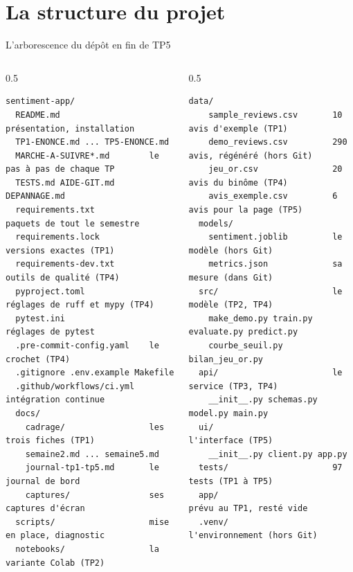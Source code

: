 \documentclass[aspectratio=169,11pt]{beamer}
\begin{document}
\section{La structure du projet}

\begin{frame}[fragile]{L'arborescence du dépôt en fin de TP5}
\begin{columns}[T]
\begin{column}{0.5\textwidth}
\begin{lstlisting}[basicstyle=\ttfamily\tiny]
sentiment-app/
  README.md                  présentation, installation
  TP1-ENONCE.md ... TP5-ENONCE.md
  MARCHE-A-SUIVRE*.md        le pas à pas de chaque TP
  TESTS.md AIDE-GIT.md DEPANNAGE.md
  requirements.txt           paquets de tout le semestre
  requirements.lock          versions exactes (TP1)
  requirements-dev.txt       outils de qualité (TP4)
  pyproject.toml             réglages de ruff et mypy (TP4)
  pytest.ini                 réglages de pytest
  .pre-commit-config.yaml    le crochet (TP4)
  .gitignore .env.example Makefile
  .github/workflows/ci.yml   intégration continue
  docs/
    cadrage/                 les trois fiches (TP1)
    semaine2.md ... semaine5.md
    journal-tp1-tp5.md       le journal de bord
    captures/                ses captures d'écran
  scripts/                   mise en place, diagnostic
  notebooks/                 la variante Colab (TP2)
\end{lstlisting}
\end{column}
\begin{column}{0.5\textwidth}
\begin{lstlisting}[basicstyle=\ttfamily\tiny]
  data/
    sample_reviews.csv       10 avis d'exemple (TP1)
    demo_reviews.csv         290 avis, régénéré (hors Git)
    jeu_or.csv               20 avis du binôme (TP4)
    avis_exemple.csv         6 avis pour la page (TP5)
  models/
    sentiment.joblib         le modèle (hors Git)
    metrics.json             sa mesure (dans Git)
  src/                       le modèle (TP2, TP4)
    make_demo.py train.py evaluate.py predict.py
    courbe_seuil.py bilan_jeu_or.py
  api/                       le service (TP3, TP4)
    __init__.py schemas.py model.py main.py
  ui/                        l'interface (TP5)
    __init__.py client.py app.py
  tests/                     97 tests (TP1 à TP5)
  app/                       prévu au TP1, resté vide
  .venv/                     l'environnement (hors Git)
\end{lstlisting}
\end{column}
\end{columns}
\end{frame}
\end{document}
